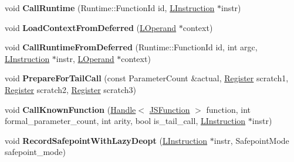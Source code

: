 \begin{DoxyCompactItemize}
\item 
void {\bfseries Call\+Runtime} (Runtime\+::\+Function\+Id id, \hyperlink{classv8_1_1internal_1_1_l_instruction}{L\+Instruction} $\ast$instr)\hypertarget{classv8_1_1internal_1_1_l_code_gen_a5a8eebd32428c2f6904e2875a4dbbb18}{}\label{classv8_1_1internal_1_1_l_code_gen_a5a8eebd32428c2f6904e2875a4dbbb18}

\item 
void {\bfseries Load\+Context\+From\+Deferred} (\hyperlink{classv8_1_1internal_1_1_l_operand}{L\+Operand} $\ast$context)\hypertarget{classv8_1_1internal_1_1_l_code_gen_a9009104c76636c80f382e04c1dd304ca}{}\label{classv8_1_1internal_1_1_l_code_gen_a9009104c76636c80f382e04c1dd304ca}

\item 
void {\bfseries Call\+Runtime\+From\+Deferred} (Runtime\+::\+Function\+Id id, int argc, \hyperlink{classv8_1_1internal_1_1_l_instruction}{L\+Instruction} $\ast$instr, \hyperlink{classv8_1_1internal_1_1_l_operand}{L\+Operand} $\ast$context)\hypertarget{classv8_1_1internal_1_1_l_code_gen_a4c3be7c7de6a86615c912e70cfc04ab4}{}\label{classv8_1_1internal_1_1_l_code_gen_a4c3be7c7de6a86615c912e70cfc04ab4}

\item 
void {\bfseries Prepare\+For\+Tail\+Call} (const Parameter\+Count \&actual, \hyperlink{structv8_1_1internal_1_1_register}{Register} scratch1, \hyperlink{structv8_1_1internal_1_1_register}{Register} scratch2, \hyperlink{structv8_1_1internal_1_1_register}{Register} scratch3)\hypertarget{classv8_1_1internal_1_1_l_code_gen_ac244b5f30d2995d51f6d263358a7ccd9}{}\label{classv8_1_1internal_1_1_l_code_gen_ac244b5f30d2995d51f6d263358a7ccd9}

\item 
void {\bfseries Call\+Known\+Function} (\hyperlink{classv8_1_1internal_1_1_handle}{Handle}$<$ \hyperlink{classv8_1_1internal_1_1_j_s_function}{J\+S\+Function} $>$ function, int formal\+\_\+parameter\+\_\+count, int arity, bool is\+\_\+tail\+\_\+call, \hyperlink{classv8_1_1internal_1_1_l_instruction}{L\+Instruction} $\ast$instr)\hypertarget{classv8_1_1internal_1_1_l_code_gen_adec87ca608c3363d2fa40b37952378b9}{}\label{classv8_1_1internal_1_1_l_code_gen_adec87ca608c3363d2fa40b37952378b9}

\item 
void {\bfseries Record\+Safepoint\+With\+Lazy\+Deopt} (\hyperlink{classv8_1_1internal_1_1_l_instruction}{L\+Instruction} $\ast$instr, Safepoint\+Mode safepoint\+\_\+mode)\hypertarget{classv8_1_1internal_1_1_l_code_gen_ae96e1ea2617dfdd8a23b554d85bdd250}{}\label{classv8_1_1internal_1_1_l_code_gen_ae96e1ea2617dfdd8a23b554d85bdd250}


\end{DoxyCompactItemize}

